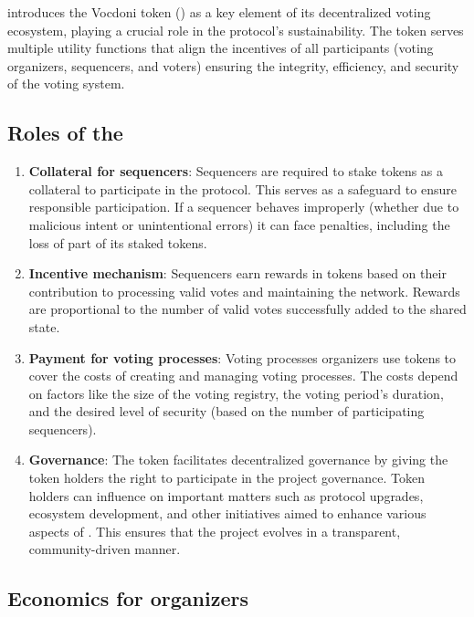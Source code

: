 
\Davinci introduces the Vocdoni token (\token) as a key element of its decentralized voting ecosystem, playing a crucial role in the protocol's sustainability.
The token serves multiple utility functions that align the incentives of all participants (voting organizers, sequencers, and voters) ensuring the integrity, efficiency, and security of the voting system.

\subsection{Roles of the \token}

\begin{enumerate}
	\item \textbf{Collateral for sequencers}: Sequencers are required to stake \token tokens as a collateral to participate in the protocol. This serves as a safeguard to ensure responsible participation. If a sequencer behaves improperly (whether due to malicious intent or unintentional errors) it can face penalties, including the loss of part of its staked tokens.
	\item \textbf{Incentive mechanism}: Sequencers earn rewards in \token tokens based on their contribution to processing valid votes and maintaining the network. Rewards are proportional to the number of valid votes successfully added to the shared state.
	\item \textbf{Payment for voting processes}: Voting processes organizers use \token tokens to cover the costs of creating and managing voting processes. The costs depend on factors like the size of the voting registry, the voting period's duration, and the desired level of security (based on the number of participating sequencers).
	\item \textbf{Governance}: The \token token facilitates decentralized governance by giving the token holders the right to participate in the project governance. Token holders can influence on important matters such as protocol upgrades, ecosystem development, and other initiatives aimed to enhance various aspects of \davinci. This ensures that the project evolves in a transparent, community-driven manner.
\end{enumerate}

\subsection{Economics for organizers}


